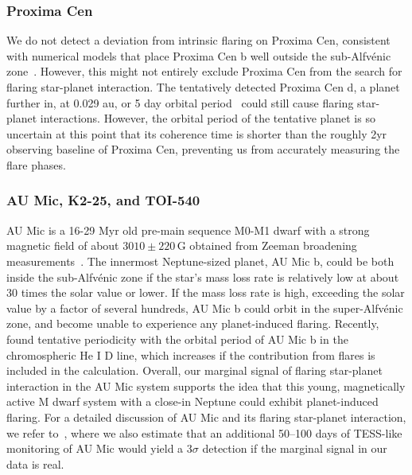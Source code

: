 \documentclass[twocolumn]{aastex631}
\begin{document}
\subsubsection{Proxima Cen}
\label{sec:results:individualstars:proxima}
We do not detect a deviation from intrinsic flaring on Proxima Cen, consistent with numerical models that place Proxima Cen b well outside the sub-Alfv\'enic zone~\citep{kavanagh2021planetinduced}. However, this might not entirely exclude Proxima Cen from the search for flaring star-planet interaction. The tentatively detected Proxima Cen d, a planet further in, at 0.029 au, or 5 day orbital period~\citep{faria2022candidate, artigau2022linebyline} could still cause flaring star-planet interactions. However, the orbital period of the tentative planet is so uncertain at this point that its coherence time is shorter than the roughly 2yr observing baseline of Proxima Cen, preventing us from accurately measuring the flare phases. 


\subsubsection{AU Mic, K2-25, and TOI-540}
\label{sec:results:individualstars:aumic}

AU Mic is a 16-29 Myr old pre-main sequence M0-M1 dwarf with a strong magnetic field of about $3010\pm220\,$G obtained from Zeeman broadening measurements~\citep{reiners2022magnetism}. The innermost Neptune-sized planet, AU Mic b, could be both inside the sub-Alfv\'enic zone if the star's mass loss rate is relatively low at about 30 times the solar value or lower. If the mass loss rate is high, exceeding the solar value by a factor of several hundreds, AU Mic b could orbit in the super-Alfv\'enic zone, and become unable to experience any planet-induced flaring. Recently, \citet{klein2022one} found tentative periodicity with the orbital period of AU Mic b in the chromospheric He I D line, which increases if the contribution from flares is included in the calculation. Overall, our marginal signal of flaring star-planet interaction in the AU Mic system supports the idea that this young, magnetically active M dwarf system with a close-in Neptune could exhibit planet-induced flaring.
For a detailed discussion of AU Mic and its flaring star-planet interaction, we refer to~\cite{ilin2022searching}, where we also estimate that an additional 50–100 days of TESS-like monitoring of AU Mic would yield a $3\sigma$ detection if the marginal signal in our data is real.
 
\end{document}
